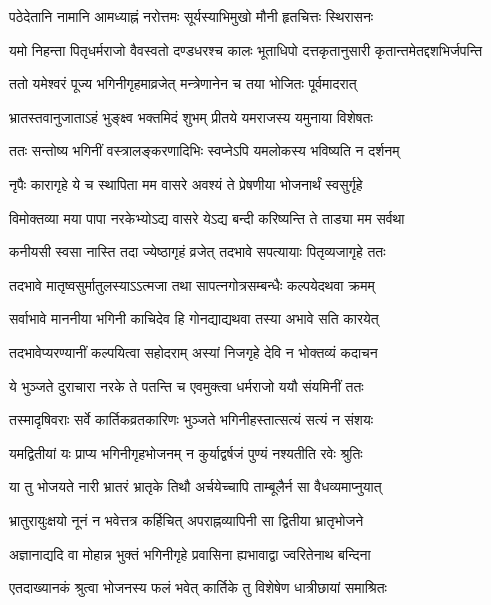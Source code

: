\twolineshloka
{पठेदेतानि नामानि आमध्याह्नं नरोत्तमः}
{सूर्यस्याभिमुखो मौनी हृतचित्तः स्थिरासनः} %

\twolineshloka
{यमो निहन्ता पितृधर्मराजो वैवस्वतो दण्डधरश्च कालः}
{भूताधिपो दत्तकृतानुसारी कृतान्तमेतद्दशभिर्जपन्ति} %

\twolineshloka
{ततो यमेश्वरं पूज्य भगिनीगृहमाव्रजेत्}
{मन्त्रेणानेन च तया भोजितः पूर्वमादरात्} %

\twolineshloka
{भ्रातस्तवानुजाताऽहं भुङ्क्ष्व भक्तमिदं शुभम्}
{प्रीतये यमराजस्य यमुनाया विशेषतः} %

\twolineshloka
{ततः सन्तोष्य भगिनीं वस्त्रालङ्करणादिभिः}
{स्वप्नेऽपि यमलोकस्य भविष्यति न दर्शनम्} %

\twolineshloka
{नृपैः कारागृहे ये च स्थापिता मम वासरे}
{अवश्यं ते प्रेषणीया भोजनार्थं स्वसुर्गृहे} %

\twolineshloka
{विमोक्तव्या मया पापा नरकेभ्योऽद्य वासरे}
{येऽद्य बन्दी करिष्यन्ति ते ताड्या मम सर्वथा} %

\twolineshloka
{कनीयसी स्वसा नास्ति तदा ज्येष्ठागृहं व्रजेत्}
{तदभावे सपत्यायाः पितृव्यजागृहे ततः} %

\twolineshloka
{तदभावे मातृष्वसुर्मातुलस्याऽऽत्मजा तथा}
{सापत्नगोत्रसम्बन्धैः कल्पयेदथवा क्रमम्} %

\twolineshloka
{सर्वाभावे माननीया भगिनी काचिदेव हि}
{गोनद्याद्यथवा तस्या अभावे सति कारयेत्} %

\twolineshloka
{तदभावेप्यरण्यानीं कल्पयित्वा सहोदराम्}
{अस्यां निजगृहे देवि न भोक्तव्यं कदाचन} %

\twolineshloka
{ये भुञ्जते दुराचारा नरके ते पतन्ति च}
{एवमुक्त्वा धर्मराजो ययौ संयमिनीं ततः} %

\twolineshloka
{तस्मादृषिवराः सर्वे कार्तिकव्रतकारिणः}
{भुञ्जते भगिनीहस्तात्सत्यं सत्यं न संशयः} %

\twolineshloka
{यमद्वितीयां यः प्राप्य भगिनीगृहभोजनम्}
{न कुर्याद्वर्षजं पुण्यं नश्यतीति रवेः श्रुतिः} %

\twolineshloka
{या तु भोजयते नारी भ्रातरं भ्रातृके तिथौ}
{अर्चयेच्चापि ताम्बूलैर्न सा वैधव्यमाप्नुयात्} %

\twolineshloka
{भ्रातुरायुःक्षयो नूनं न भवेत्तत्र कर्हिचित्}
{अपराह्नव्यापिनी सा द्वितीया भ्रातृभोजने} %

\twolineshloka
{अज्ञानाद्यदि वा मोहान्न भुक्तं भगिनीगृहे}
{प्रवासिना ह्यभावाद्वा ज्वरितेनाथ बन्दिना} %

\twolineshloka
{एतदाख्यानकं श्रुत्वा भोजनस्य फलं भवेत्}
{कार्तिके तु विशेषेण धात्रीछायां समाश्रितः} %


